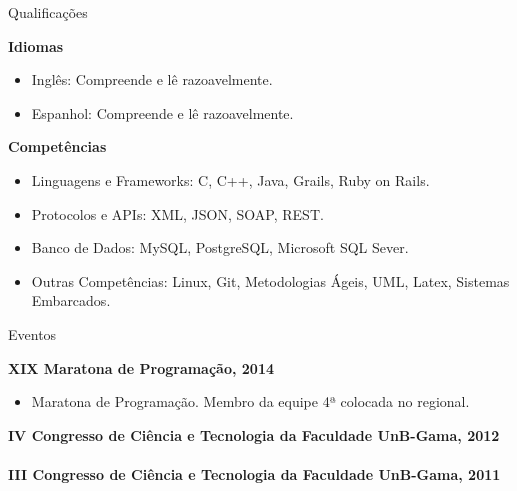 \documentclass{resume} %
\begin{document}
\begin{rSection}{Qualificações}

\textbf{Idiomas}
\begin{itemize}
	\item Inglês: Compreende e lê razoavelmente.
	\item Espanhol: Compreende e lê razoavelmente.
\end{itemize}

\textbf{Competências}
\begin{itemize}
	\item Linguagens e Frameworks: C, C++, Java, Grails, Ruby on Rails.
	\item Protocolos e APIs: XML, JSON, SOAP, REST.
	\item Banco de Dados: MySQL, PostgreSQL, Microsoft SQL Sever.
	\item Outras Competências: Linux, Git, Metodologias Ágeis, UML, Latex, Sistemas Embarcados.
\end{itemize}

\end{rSection}


\begin{rSection}{Eventos}

\textbf{XIX Maratona de Programação, 2014}
\begin{itemize}
	\item Maratona de Programação. Membro da equipe 4ª colocada no regional.
\end{itemize}

\textbf{IV Congresso de Ciência e Tecnologia da Faculdade UnB-Gama, 2012}
\\
\\
\textbf{III Congresso de Ciência e Tecnologia da Faculdade UnB-Gama, 2011}

\end{rSection}




\end{document}
